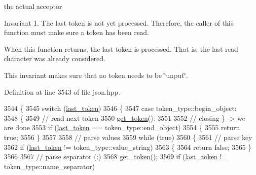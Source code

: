 the actual acceptor 

\begin{DoxyInvariant}{Invariant}
1. The last token is not yet processed. Therefore, the caller of this function must make sure a token has been read.
\begin{DoxyEnumerate}
\item When this function returns, the last token is processed. That is, the last read character was already considered.
\end{DoxyEnumerate}
\end{DoxyInvariant}
This invariant makes sure that no token needs to be \char`\"{}unput\char`\"{}. 

Definition at line 3543 of file json.\+hpp.


\begin{DoxyCode}
3544     \{
3545         \textcolor{keywordflow}{switch} (\hyperlink{classnlohmann_1_1detail_1_1parser_a932e49f6f4d291557846744319245994}{last\_token})
3546         \{
3547             \textcolor{keywordflow}{case} token\_type::begin\_object:
3548             \{
3549                 \textcolor{comment}{// read next token}
3550                 \hyperlink{classnlohmann_1_1detail_1_1parser_a33f3859d0dd402445b5859070fd24bab}{get\_token}();
3551 
3552                 \textcolor{comment}{// closing \} -> we are done}
3553                 \textcolor{keywordflow}{if} (\hyperlink{classnlohmann_1_1detail_1_1parser_a932e49f6f4d291557846744319245994}{last\_token} == token\_type::end\_object)
3554                 \{
3555                     \textcolor{keywordflow}{return} \textcolor{keyword}{true};
3556                 \}
3557 
3558                 \textcolor{comment}{// parse values}
3559                 \textcolor{keywordflow}{while} (\textcolor{keyword}{true})
3560                 \{
3561                     \textcolor{comment}{// parse key}
3562                     \textcolor{keywordflow}{if} (\hyperlink{classnlohmann_1_1detail_1_1parser_a932e49f6f4d291557846744319245994}{last\_token} != token\_type::value\_string)
3563                     \{
3564                         \textcolor{keywordflow}{return} \textcolor{keyword}{false};
3565                     \}
3566 
3567                     \textcolor{comment}{// parse separator (:)}
3568                     \hyperlink{classnlohmann_1_1detail_1_1parser_a33f3859d0dd402445b5859070fd24bab}{get\_token}();
3569                     \textcolor{keywordflow}{if} (\hyperlink{classnlohmann_1_1detail_1_1parser_a932e49f6f4d291557846744319245994}{last\_token} != token\_type::name\_separator)

\end{DoxyCode}
